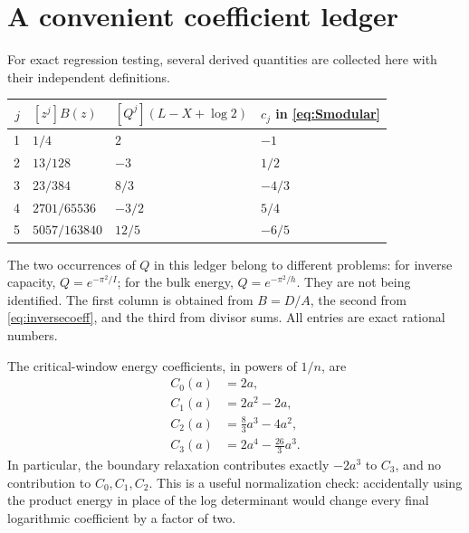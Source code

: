 \documentclass[11pt,a4paper]{article}
\theoremstyle{definition}
\theoremstyle{remark}
\begin{document}
\section{A convenient coefficient ledger}
\label{sec:ledger}
For exact regression testing, several derived quantities are collected
here with their independent definitions.

\begin{center}
\begin{tabular}{@{}rlll@{}}
\toprule
$j$ & $[z^j]B(z)$ & $[Q^j](L-X+\log2)$ & $c_j$ in \eqref{eq:Smodular}\\
\midrule
1 & $1/4$ & $2$ & $-1$\\
2 & $13/128$ & $-3$ & $1/2$\\
3 & $23/384$ & $8/3$ & $-4/3$\\
4 & $2701/65536$ & $-3/2$ & $5/4$\\
5 & $5057/163840$ & $12/5$ & $-6/5$\\
\bottomrule
\end{tabular}
\end{center}
The two occurrences of $Q$ in this ledger belong to different problems:
for inverse capacity, $Q=e^{-\pi^2/I}$; for the bulk energy,
$Q=e^{-\pi^2/h}$. They are not being identified. The first column is
obtained from $B=D/A$, the second from \eqref{eq:inversecoeff}, and the
third from divisor sums. All entries are exact rational numbers.

The critical-window energy coefficients, in powers of $1/n$, are
\begin{align*}
 C_0(a)&=2a,\\
 C_1(a)&=2a^2-2a,\\
 C_2(a)&=\tfrac83a^3-4a^2,\\
 C_3(a)&=2a^4-\tfrac{26}3a^3.
\end{align*}
In particular, the boundary relaxation contributes exactly $-2a^3$ to
$C_3$, and no contribution to $C_0,C_1,C_2$. This is a useful normalization
check: accidentally using the product energy in place of the log
determinant would change every final logarithmic coefficient by a factor
of two.
\end{document}
